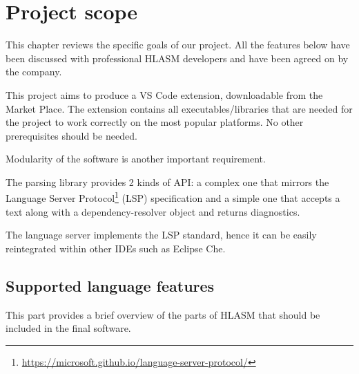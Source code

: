 \chapter{Project scope}

This chapter reviews the specific goals of our project.
All the features below have been discussed with professional HLASM developers and have been agreed on by the company.

This project aims to produce a VS Code extension, downloadable from the Market Place. The extension contains all executables/libraries that are needed for the project to work correctly on the most popular platforms. No other prerequisites should be needed.

Modularity of the software is another important requirement. 

The parsing library provides 2 kinds of API: a complex one that mirrors the Language Server Protocol\footnote{\url{https://microsoft.github.io/language-server-protocol/}} (LSP) specification and a simple one that accepts a text along with a dependency-resolver object and returns diagnostics. 

The language server implements the LSP standard, hence it can be easily reintegrated within other IDEs such as Eclipse Che.

\section{Supported language features}
This part provides a brief overview of the parts of HLASM that should be included in the final software.

